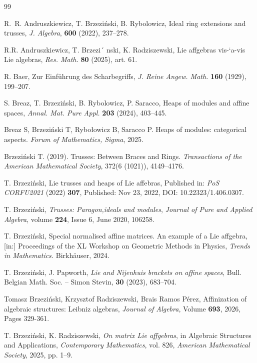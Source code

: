 \documentclass{article}
\theoremstyle{definition}
\theoremstyle{remark}
\theoremstyle{plain}
\begin{document}
\begin{thebibliography}{99}

R.~R. Andruszkiewicz, T. Brzezi\'nski, B. Rybolowicz,
Ideal ring extensions and trusses,
\emph{J. Algebra}, \textbf{600} (2022), 237--278.

R.R. Andruszkiewicz, T. Brzezi´ nski, K. Radziszewski, Lie affgebras vis-`a-vis Lie algebras, \emph{Res. Math.} \textbf{80} (2025), art. 61.

R. Baer, Zur Einf\"uhrung des Scharbegriffs,
\emph{J. Reine Angew. Math.} \textbf{160} (1929), 199--207.

S. Breaz, T. Brzezi\'nski, B. Rybolowicz, P. Saracco,
Heaps of modules and affine spaces,
\emph{Annal. Mat. Pure Appl.} \textbf{203} (2024), 403--445.

Breaz S, Brzeziński T, Rybołowicz B, Saracco P. Heaps of modules: categorical aspects. \emph{Forum of Mathematics, Sigma}, 2025.

Brzeziński T. (2019). Trusses: Between Braces and Rings. \emph{Transactions of the American Mathematical Society}, 372(6 (1021)), 4149–4176.

T. Brzezi\'nski, Lie trusses and heaps of Lie affebras, Published in: \emph{PoS CORFU2021} (2022) \textbf{307},
Published: Nov 23, 2022,
DOI: 10.22323/1.406.0307.

T. Brzezi\'nski,
\textit{Trusses: Paragon,ideals and modules}, \emph{Journal of Pure and Applied Algebra}, volume \textbf{224}, Issue 6, June 2020, 106258.

T. Brzezi\'nski,
Special normalised affine matrices. An example of a Lie affgebra,
[in:] Proceedings of the XL Workshop on Geometric Methods in Physics, \emph{Trends in Mathematics.}
Birkh\"auser, 2024.

T. Brzezi\'nski, J. Papworth,
\textit{Lie and Nijenhuis brackets on affine spaces},
Bull. Belgian Math. Soc. -- Simon Stevin, \textbf{30} (2023), 683--704.

Tomasz Brzeziński, Krzysztof Radziszewski, Brais Ramos Pérez,
Affinization of algebraic structures: Leibniz algebras, \emph{Journal of Algebra},
Volume \textbf{693}, 2026, Pages 329-361.

T. Brzezi\'nski, K. Radziszewski,
\textit{On matrix Lie affgebras}, in Algebraic Structures and Applications, \emph{Contemporary Mathematics}, vol. 826, \emph{American Mathematical Society}, 2025, pp. 1–9.
 

\end{thebibliography}
\end{document}
